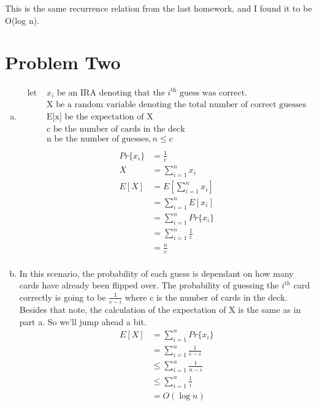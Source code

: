 \documentclass[a4paper,12pt]{article}
\begin{document}
\noindent This is the same recurrence relation from the last homework, and I found
it to be\\ O(log n).

\section{Problem Two}

\begin{enumerate}[a)]
  \item 
    \begin{align*}
      \text{let } & \text{\(x_i\) be an IRA denoting that the \(i^\text{th}\) guess was correct.}\\
      & \text{X be a random variable denoting the total number of correct guesses}\\
      & \text{E[x] be the expectation of X}\\
      & \text{c be the number of cards in the deck}\\
      & \text{n be the number of guesses}, n \le c\\
    \end{align*}
    \begin{align*}
      Pr\{x_i\}& = \frac{1}{c}\\
      X& = \sum_{i=1}^n x_i\\
      E[X]& = E\left[\sum_{i=1}^n x_i\right]\\
      & = \sum_{i=1}^n E[x_i]\\
      & = \sum_{i=1}^n Pr\{x_i\}\\
      & = \sum_{i=1}^n \frac{1}{c}\\
      & = \frac{n}{c}\\
    \end{align*}

  \item
    In this scenario, the probability of each guess is dependant on how many cards have
    already been flipped over. The probability of guessing the \(i^{th}\) card correctly
    is going to be \(\frac{1}{c-i}\) where c is the number of cards in the deck. 
    Besides that note, the calculation of the expectation of X is the same as
    in part a. So we'll jump ahead a bit.
    \begin{align*}
      E[X]& = \sum_{i=1}^n Pr\{x_i\}\\
      & = \sum_{i=1}^n \frac{1}{c-i}\\
      & \le \sum_{i=1}^n \frac{1}{n-i}\\
      & \le \sum_{i=1}^n \frac{1}{i}\\
      & = O(\log n)\\
    \end{align*}
\end{enumerate}
\end{document}
